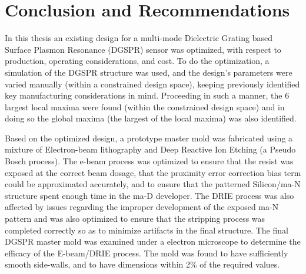 

\chapter{Conclusion and Recommendations}

In this thesis an existing design for a multi-mode Dielectric Grating based Surface Plasmon Resonance (DGSPR) sensor was optimized, with respect to production, operating considerations, and cost. To do the optimization, a simulation of the DGSPR structure was used, and the design's parameters were varied manually (within a constrained design space), keeping previously identified key manufacturing considerations in mind. Proceeding in such a manner, the 6 largest local maxima were found (within the constrained design space) and in doing so the global maxima (the largest of the local maxima) was also identified. 

Based on the optimized design, a prototype master mold was fabricated using a mixture of Electron-beam lithography and Deep Reactive Ion Etching (a Pseudo Bosch process). The e-beam process was optimized to ensure that the resist was exposed at the correct beam dosage, that the proximity error correction bias term could be approximated accurately, and to ensure that the patterned Silicon/ma-N structure spent enough time in the ma-D developer. The DRIE process was also affected by issues regarding the improper development of the exposed ma-N pattern and was also optimized to ensure that the stripping process was completed correctly so as to minimize artifacts in the final structure. The final DGSPR master mold was examined under a electron microscope to determine the efficacy of the E-beam/DRIE process. The mold was found to have sufficiently smooth side-walls, and to have dimensions within 2\% of the required values.

